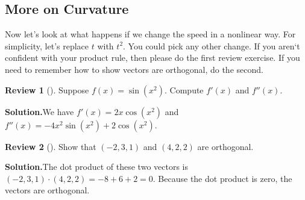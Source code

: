 \documentclass[10pt,]{book}
\theoremstyle{plain}
\theoremstyle{definition}
\theoremstyle{definition}
\theoremstyle{definition}
\newtheorem{project}{Review}[section]
\theoremstyle{definition}
\theoremstyle{definition}
\numberwithin{equation}{section}
\begin{document}
\subsection[{More on Curvature}]{More on Curvature}\label{subsection-44}
Now let's look at what happens if we change the speed in a nonlinear way. For simplicity, let's replace \(t\) with \(t^2\). You could pick any other change. If you aren`t confident with your product rule, then please do the first review exercise. If you need to remember how to show vectors are orthogonal, do the second.%
\begin{project}[]\label{project-12}
Suppose \(f(x) = \sin(x^2)\). Compute \(f'(x)\) and \(f''(x)\).%
\par\medskip\noindent%
\textbf{Solution.}\quad We have \(f'(x) = 2x\cos(x^2)\) and \(f''(x) = -4x^2\sin(x^2)+2\cos(x^2)\).%
\end{project}
\begin{project}[]\label{project-13}
Show that \((-2,3,1)\) and \((4,2,2)\) are orthogonal.%
\par\medskip\noindent%
\textbf{Solution.}\quad The dot product of these two vectors is \((-2,3,1)\cdot(4,2,2) = -8+6+2=0\). Because the dot product is zero, the vectors are orthogonal.%
\end{project}
\end{document}
